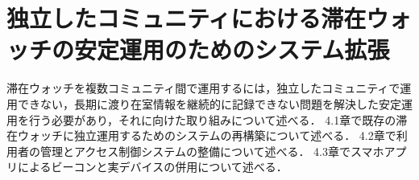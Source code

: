 \chapter{独立したコミュニティにおける滞在ウォッチの安定運用のためのシステム拡張}\label{4}

滞在ウォッチを複数コミュニティ間で運用するには，独立したコミュニティで運用できない，長期に渡り在室情報を継続的に記録できない問題を解決した安定運用を行う必要があり，それに向けた取り組みについて述べる．
4.1章で既存の滞在ウォッチに独立運用するためのシステムの再構築について述べる．
4.2章で利用者の管理とアクセス制御システムの整備について述べる．
4.3章でスマホアプリによるビーコンと実デバイスの併用について述べる．







